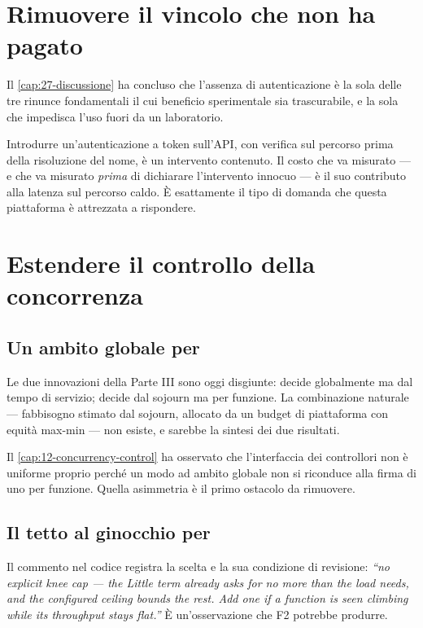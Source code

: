 \section{Rimuovere il vincolo che non ha pagato}

Il \cref{cap:27-discussione} ha concluso che l'assenza di autenticazione \`e la
sola delle tre rinunce fondamentali il cui beneficio sperimentale sia
trascurabile, e la sola che impedisca l'uso fuori da un laboratorio.

Introdurre un'autenticazione a token sull'API, con verifica sul percorso prima
della risoluzione del nome, \`e un intervento contenuto. Il costo che va misurato
--- e che va misurato \emph{prima} di dichiarare l'intervento innocuo --- \`e il
suo contributo alla latenza sul percorso caldo. \`E esattamente il tipo di
domanda che questa piattaforma \`e attrezzata a rispondere.

\section{Estendere il controllo della concorrenza}

\subsection{Un ambito globale per }

Le due innovazioni della Parte III sono oggi disgiunte:  decide
globalmente ma dal tempo di servizio;  decide dal sojourn ma per
funzione. La combinazione naturale --- fabbisogno stimato dal sojourn, allocato
da un budget di piattaforma con equit\`a max-min --- non esiste, e sarebbe la
sintesi dei due risultati.

Il \cref{cap:12-concurrency-control} ha osservato che l'interfaccia dei
controllori non \`e uniforme proprio perch\'e un modo ad ambito globale non si
riconduce alla firma di uno per funzione. Quella asimmetria \`e il primo
ostacolo da rimuovere.

\subsection{Il tetto al ginocchio per }

Il commento nel codice registra la scelta e la sua condizione di revisione:
\emph{``no explicit knee cap --- the Little term already asks for no more than
the load needs, and the configured ceiling bounds the rest. Add one if a
function is seen climbing while its throughput stays flat.''} \`E un'osservazione
che F2 potrebbe produrre.

